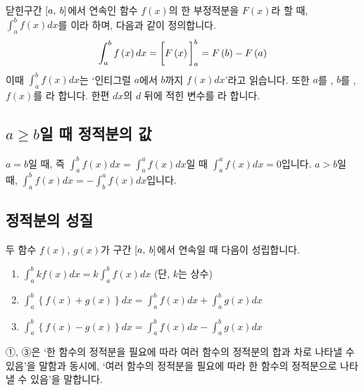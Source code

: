닫힌구간 $\left[a,\: b\right]$에서 연속인 함수 $f\left( x \right) $의 한 부정적분을 $F\left( x \right) $라 할 때, $\int_{a}^{b} f(x) dx$를 이라 하며, 다음과 같이 정의합니다.
\begin{align*}\int_{a}^{b}f\left( x \right)dx= \bigg[F\left( x \right) \bigg]_{a}^{b} =F\left( b \right) - F\left( a \right)\end{align*}
    이때 $\int_{a}^{b} f(x) dx$는 `인티그럴 $a$에서 $b$까지 $f(x)dx$'라고 읽습니다. 또한 $a$를 , $b$를 , $f(x)$를 라 합니다. 한편 $dx$의 $d$ 뒤에 적힌 변수를 라 합니다.

\subsection{$a \ge b$일 때 정적분의 값}
$a=b$일 때, 즉 $\int_{a}^{b}f\left( x \right) dx= \int_{a}^{a}f\left( x \right) dx$일 때 $\int_{a}^{a}f\left( x \right) dx=0$입니다. $a>b$일 때, $\int_{a}^{b}f\left( x \right) dx = -\int_{b}^{a}f\left( x \right) dx$입니다.
\clearpage
\subsection{정적분의 성질}
두 함수 $f\left( x \right) $, $g\left( x \right) $가 구간 $\left[a,\: b\right]$에서 연속일 때 다음이 성립합니다.
\begin{enumerate}[label={\onum*}]
    \item $\int_{a}^{b}kf\left( x \right) dx = k\int_{a}^{b}f\left( x \right) dx$ (단, $k$는 상수)
    \item $\int_{a}^{b}\left\{ f\left( x \right) + g\left( x \right)  \right\}dx = \int_{a}^{b}f\left( x \right) dx + \int_{a}^{b}g\left( x \right) dx$
    \item $\int_{a}^{b}\left\{ f\left( x \right) - g\left( x \right)  \right\}dx  = \int_{a}^{b}f\left( x \right) dx - \int_{a}^{b}g\left( x \right) dx$
\end{enumerate}
①, ③은 `한 함수의 정적분을 필요에 따라 여러 함수의 정적분의 합과 차로 나타낼 수 있음'을 말함과 동시에, `여러 함수의 정적분을 필요에 따라 한 함수의 정적분으로 나타낼 수 있음'을 말합니다.

